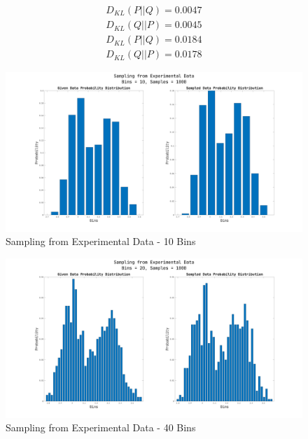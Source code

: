 \documentclass[a4paper]{article}
\begin{document}
\begin{multicols}{2}
  \begin{equation}
  \begin{aligned}
    D_{KL}(P || Q) = 0.0047\\
	D_{KL}(Q || P) = 0.0045
	\end{aligned}
  \end{equation}\break
  \begin{equation}
      \begin{aligned}
    D_{KL}(P || Q) = 0.0184\\
	D_{KL}(Q || P) = 0.0178
	\end{aligned}
  \end{equation}
\end{multicols}
\begin{figure}[h!]
  \includegraphics[width=\textwidth]{part2/figure2}
  \caption{Sampling from Experimental Data - 10 Bins}
  \label{fig:rsp200}
\end{figure}
\begin{figure}[h!]
  \includegraphics[width=\textwidth]{part2/figure3}
  \caption{Sampling from Experimental Data - 40 Bins}
  \label{fig:rsp200}
\end{figure}
\end{document}
